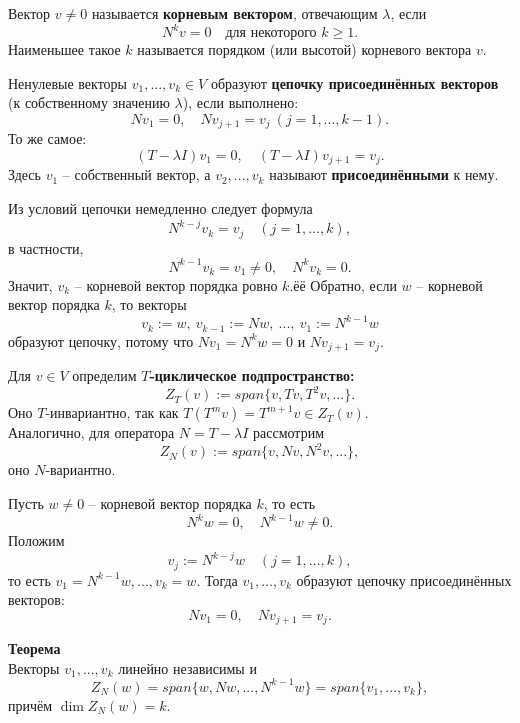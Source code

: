 \documentclass[14pt]{extreport}
\begin{document}
    \begin{defbox}
        Вектор $v \neq 0$ называется \textbf{корневым вектором}, отвечающим $\lambda$, если
        \[
        N^kv = 0 \quad \text{для некоторого $k \geq 1$.}
        \]
        Наименьшее такое $k$ называется порядком (или высотой) корневого вектора $v$.
    \end{defbox}

    \begin{defbox}
        Ненулевые векторы $v_1, ..., v_k \in V$ образуют \textbf{цепочку присоединённых векторов} (к собственному значению $\lambda$), если выполнено:
        \[
        Nv_1 = 0, \quad Nv_{j+1} = v_j\ (j=1,...,k-1).
        \]
        То же самое:
        \[
        (T - \lambda I) v_1 = 0, \quad (T - \lambda I) v_{j+1} = v_j.
        \]
        Здесь $v_1$ – собственный вектор, а $v_2, ..., v_k$ называют \textbf{присоединёнными} к нему.
    \end{defbox}

    \begin{impbox}
        Из условий цепочки немедленно следует формула
        \[
        N^{k-j} v_k = v_j \quad (j = 1,...,k),
        \]
        в частности,
        \[
        N^{k-1} v_k = v_1 \neq 0, \quad N^k v_k = 0.
        \]
        Значит, $v_k$ – корневой вектор порядка ровно $k$.ёё
        Обратно, если $w$ – корневой вектор порядка $k$, то векторы
        \[
        v_k := w,\ v_{k-1} := Nw,\ ...,\ v_1 := N^{k-1}w
        \]
        образуют цепочку, потому что $Nv_1 = N^kw = 0$ и $Nv_{j+1} = v_j$.
    \end{impbox}

    \begin{defbox}
        Для $v \in V$ определим \textbf{$T$-циклическое подпространство:}
        \[
        Z_T(v) := span \{ v,Tv,T^2v,... \}.
        \]
        Оно $T$-инвариантно, так как $T(T^mv) = T^{m+1}v \in Z_T(v)$.\\
        Аналогично, для оператора $N = T - \lambda I$ рассмотрим
        \[
        Z_N(v) := span \{ v,Nv,N^2v,... \},
        \]
        оно $N$-вариантно.
    \end{defbox}

    \begin{thbox}
        Пусть $w \neq 0$ – корневой вектор порядка $k$, то есть
        \[
        N^kw = 0, \quad N^{k-1}w \neq 0.
        \]
        Положим
        \[
        v_j := N^{k-j}w \quad (j = 1,...,k),
        \]
        то есть $v_1 = N^{k-1}w,...,v_k=w$. Тогда $v_1,...,v_k$ образуют цепочку присоединённых векторов:
        \[
        Nv_1 = 0, \quad Nv_{j+1} = v_j.
        \]

        \textbf{Теорема}\\
        Векторы $v_1,...,v_k$ линейно независимы и
        \[
        Z_N(w) = span \{ w,Nw,...,N^{k-1}w \} = span \{ v_1,...,v_k \},
        \]
        причём $\dim Z_N(w) = k$.
    \end{thbox}
\end{document}
